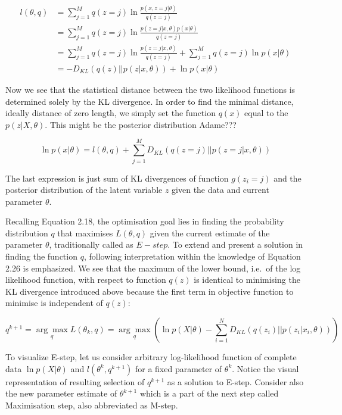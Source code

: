 \begin{align}
l(\theta,q) &= \sum_{j=1}^{M} q(z = j) \ln \frac{p(x, z = j|\theta)}{q(z = j)} \\
& = \sum_{j=1}^{M} q(z = j) \ln \frac{p(z = j|x,\theta) p(x|\theta)}{q(z = j)} \\
& = \sum_{j=1}^{M} q(z = j) \ln \frac{p(z = j|x,\theta)}{q(z = j)} + \sum_{j=1}^{M} q(z = j) \ln p(x|\theta)\\
& = -D_{KL}(q(z)||p(z|x,\theta)) + \ln p(x|\theta)
\end{align}

Now we see that the statistical distance between the two likelihood functions is determined solely by the KL divergence. In order to find the minimal distance, ideally distance of zero length, we simply set the function $q(x)$ equal to the $p(z|X,\theta)$. This might be the posterior distribution Adame???

\begin{equation}
\ln p(x|\theta) = l(\theta,q) + \sum_{j=1}^{M} D_{KL}(q(z=j)||p(z=j|x,\theta)) 
\end{equation}
   
The last expression is just sum of KL divergences of function $g(z_i = j)$ and the posterior distribution of the latent variable $z$ given the data and current parameter $\theta$. 

Recalling Equation 2.18, the optimisation goal lies in finding the probability distribution $q$ that maximises $L(\theta, q)$ given the current estimate of the parameter $\theta$, traditionally called as $E-step$. To extend and present a solution in finding the function $q$, following interpretation within the knowledge of Equation 2.26 is emphasized. We see that the maximum of the lower bound, i.e.\ of the log likelihood function, with respect to function $q(z)$ is identical to minimising the KL divergence introduced above because the first term in objective function to minimise is independent of $q(z)$: 

\begin{equation}
q^{k+1} = \underset{q}{\arg\max} L(\theta_k, q) = \underset{q}{\arg\max} (\ln p(X|\theta)  - \sum_{i=1}^{N} D_{KL} (q(z_i) || p(z_i|x_i,\theta)))
\end{equation}

To visualize E-step, let us consider arbitrary log-likelihood function of complete data $\ln p(X|\theta)$ and $l(\theta^k,q^{k+1})$ for a fixed parameter of $\theta^k$. Notice the visual representation of resulting selection of $q^{k+1}$ as a solution to E-step. Consider also the new parameter estimate of $\theta^{k+1}$ which is a part of the next step called Maximisation step, also abbreviated as M-step.

